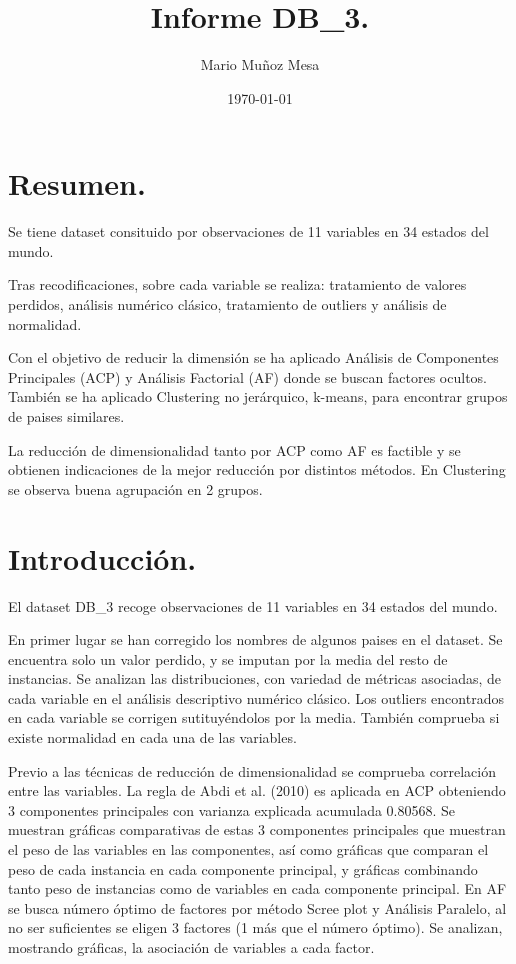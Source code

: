 \documentclass[11pt,a4paper]{article}
\title{\huge \bf Informe DB\_3.}
\author{Mario Muñoz Mesa}
\date{\today}
\begin{document}
	\maketitle
	\renewcommand*\contentsname{Índice}	
	\tableofcontents
	
	\newpage
    \section{Resumen.}
    Se tiene dataset consituido por observaciones de 11 variables en 34 estados del mundo.
    
    Tras recodificaciones, sobre cada variable se realiza: tratamiento de valores perdidos, análisis numérico clásico, tratamiento de outliers y análisis de normalidad.
    
    Con el objetivo de reducir la dimensión se ha aplicado Análisis de Componentes Principales (ACP) y Análisis Factorial (AF) donde se buscan factores ocultos. También se ha aplicado Clustering no jerárquico, k-means, para encontrar grupos de paises similares.
    
    La reducción de dimensionalidad tanto por ACP como AF es factible y se obtienen indicaciones de la mejor reducción por distintos métodos. En Clustering se observa buena agrupación en 2 grupos.

    \section{Introducción.}
    El dataset DB\_3 recoge observaciones de 11 variables en 34 estados del mundo. 
    
    En primer lugar se han corregido los nombres de algunos paises en el dataset. Se encuentra solo un valor perdido, y se imputan por la media del resto de instancias. Se analizan las distribuciones, con variedad de métricas asociadas, de cada variable en el análisis descriptivo numérico clásico. Los outliers encontrados en cada variable se corrigen sutituyéndolos por la media. También comprueba si existe normalidad en cada una de las variables. 
    
    Previo a las técnicas de reducción de dimensionalidad se comprueba correlación entre las variables. La regla de Abdi et al. (2010) es aplicada en ACP obteniendo 3 componentes principales con varianza explicada acumulada 0.80568. Se muestran gráficas comparativas de estas 3 componentes principales que muestran el peso de las variables en las componentes, así como gráficas que comparan el peso de cada instancia en cada componente principal, y gráficas combinando tanto peso de instancias como de variables en cada componente principal. En AF se busca número óptimo de factores por método Scree plot y Análisis Paralelo, al no ser suficientes se eligen 3 factores (1 más que el número óptimo). Se analizan, mostrando gráficas, la asociación de variables a cada factor.
    
\end{document}
